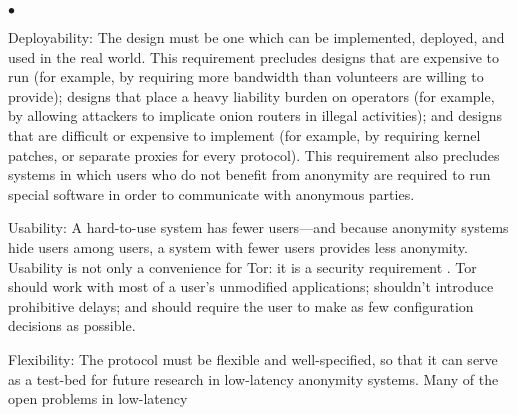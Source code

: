 \documentclass[times,10pt,twocolumn]{article}
\newenvironment{tightlist}{\begin{list}{$\bullet$}{
  \setlength{\itemsep}{0mm}
    \setlength{\parsep}{0mm}
    }}{\end{list}}
\begin{document}
\begin{tightlist}
\item[Deployability:] The design must be one which can be implemented,
  deployed, and used in the real world.  This requirement precludes designs
  that are expensive to run (for example, by requiring more bandwidth than
  volunteers are willing to provide); designs that place a heavy liability
  burden on operators (for example, by allowing attackers to implicate onion
  routers in illegal activities); and designs that are difficult or expensive
  to implement (for example, by requiring kernel patches, or separate proxies
  for every protocol).  This requirement also precludes systems in which
  users who do not benefit from anonymity are required to run special
  software in order to communicate with anonymous parties.
%
\item[Usability:] A hard-to-use system has fewer users---and because
  anonymity systems hide users among users, a system with fewer users
  provides less anonymity.  Usability is not only a convenience for Tor:
  it is a security requirement \cite{econymics,back01}. Tor
  should work with most of a user's unmodified applications; shouldn't
  introduce prohibitive delays; and should require the user to make as few
  configuration decisions as possible.
\item[Flexibility:] The protocol must be flexible and
  well-specified, so that it can serve as a test-bed for future research in
  low-latency anonymity systems.  Many of the open problems in low-latency

\end{tightlist}
\end{document}
